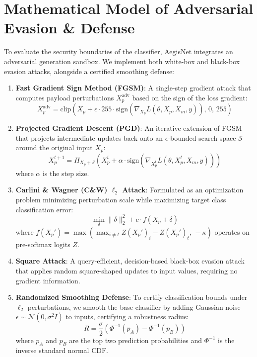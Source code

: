 \documentclass[journal,twoside]{IEEEtran}
\begin{document}
\section{Mathematical Model of Adversarial Evasion \& Defense}
\label{sec:evasion}
To evaluate the security boundaries of the classifier, AegisNet integrates an adversarial generation sandbox. We implement both white-box and black-box evasion attacks, alongside a certified smoothing defense:
\begin{enumerate}
    \item \textbf{Fast Gradient Sign Method (FGSM)}: A single-step gradient attack that computes payload perturbations $X_p^{\text{adv}}$ based on the sign of the loss gradient:
    \begin{equation}
    X_p^{\text{adv}} = \text{clip} \left( X_p + \epsilon \cdot 255 \cdot \text{sign}\left( \nabla_{X_p} L(\theta, X_p, X_m, y) \right), \, 0, \, 255 \right)
    \end{equation}
    \item \textbf{Projected Gradient Descent (PGD)}: An iterative extension of FGSM that projects intermediate updates back onto an $\epsilon$-bounded search space $\mathcal{S}$ around the original input $X_p$:
    \begin{equation}
    X_p^{t+1} = \Pi_{X_p + \mathcal{S}} \left( X_p^t + \alpha \cdot \text{sign}\left( \nabla_{X_p^t} L(\theta, X_p^t, X_m, y) \right) \right)
    \end{equation}
    where $\alpha$ is the step size.
    \item \textbf{Carlini \& Wagner (C\&W) $\ell_2$ Attack}: Formulated as an optimization problem minimizing perturbation scale while maximizing target class classification error:
    \begin{equation}
    \min_{\delta} \|\delta\|_2^2 + c \cdot f(X_p + \delta)
    \end{equation}
    where $f(X_p') = \max\left( \max_{i \neq t} Z(X_p')_i - Z(X_p')_t, \, -\kappa \right)$ operates on pre-softmax logits $Z$.
    \item \textbf{Square Attack}: A query-efficient, decision-based black-box evasion attack that applies random square-shaped updates to input values, requiring no gradient information.
    \item \textbf{Randomized Smoothing Defense}: To certify classification bounds under $\ell_2$ perturbations, we smooth the base classifier by adding Gaussian noise $\epsilon \sim \mathcal{N}(0, \sigma^2 I)$ to inputs, certifying a robustness radius:
    \begin{equation}
    R = \frac{\sigma}{2} \left( \Phi^{-1}(p_A) - \Phi^{-1}(p_B) \right)
    \end{equation}
    where $p_A$ and $p_B$ are the top two prediction probabilities and $\Phi^{-1}$ is the inverse standard normal CDF.
\end{enumerate}
\end{document}
